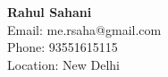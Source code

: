 \documentclass[11pt,a4paper]{article}
\begin{document}
\begin{center}
  {\LARGE \textbf{Rahul Sahani}}\\[0.5em]
  {\large Email: me.rsaha@gmail.com}\\
  {\large Phone: 93551615115}\\
  {\large Location: New Delhi}\\
\end{center}
\end{document}

